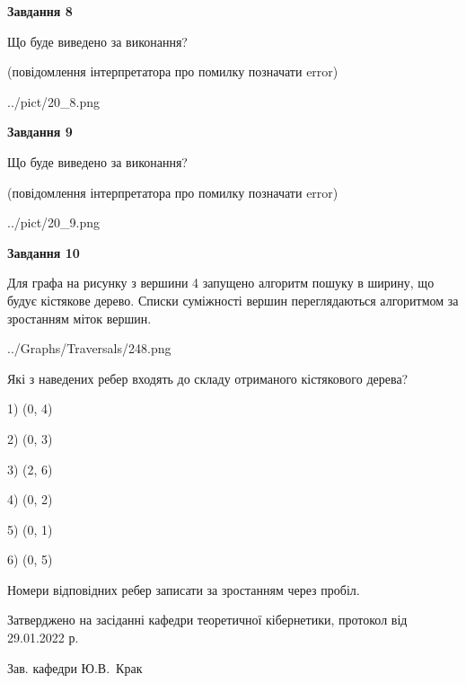 \documentclass[12pt, ukrainian]{article}
\begin{document}
{\begin {large}
{\begin {center}\textbf{Завдання 8}\end {center}}\par
Що буде виведено за виконання?\par
 (повідомлення інтерпретатора про помилку позначати error)
\begin{center}
	{../pict/20_8.png}
\end{center}
\newpage

{\begin {center}\textbf{Завдання 9}\end {center}}\par
Що буде виведено за виконання?\par
 (повідомлення інтерпретатора про помилку позначати error)\par
\begin{center}
	{../pict/20_9.png}
\end{center}
\newpage

{\begin {center}\textbf{Завдання 10}\end {center}}\par
Для графа на рисунку з вершини 4 запущено алгоритм пошуку в ширину, що будує кістякове дерево. Списки суміжності вершин переглядаються алгоритмом за зростанням міток вершин.\par
\begin{center}
	{../Graphs/Traversals/248.png}
\end{center}
\par Які з наведених ребер входять до складу отриманого кістякового дерева?\par
1) (0, 4)\par
2) (0, 3)\par
3) (2, 6)\par
4) (0, 2)\par
5) (0, 1)\par
6) (0, 5)\par
{\vskip 15pt} Номери відповідних ребер записати за зростанням через пробіл.\par
\newpage


\end {large}
}
{\smallskip \begin {small} Затверджено на засіданні кафедри теоретичної кібернетики, протокол  від   29.01.2022 р.\par\smallskip\smallskip
{\parbox {6.5 cm}{Зав. кафедри \dotfill Ю.В.~Крак}} \end{small}}
\end{document}
